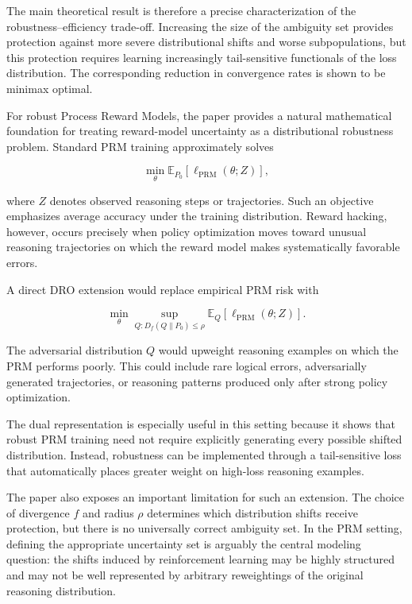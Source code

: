 \documentclass[11pt]{article}
\begin{document}
The main theoretical result is therefore a precise characterization of the robustness--efficiency trade-off. Increasing the size of the ambiguity set provides protection against more severe distributional shifts and worse subpopulations, but this protection requires learning increasingly tail-sensitive functionals of the loss distribution. The corresponding reduction in convergence rates is shown to be minimax optimal.

For robust Process Reward Models, the paper provides a natural mathematical foundation for treating reward-model uncertainty as a distributional robustness problem. Standard PRM training approximately solves

\[
\min_{\theta}
\mathbb{E}_{P_0}
\left[
\ell_{\mathrm{PRM}}(\theta;Z)
\right],
\]

where \(Z\) denotes observed reasoning steps or trajectories. Such an objective emphasizes average accuracy under the training distribution. Reward hacking, however, occurs precisely when policy optimization moves toward unusual reasoning trajectories on which the reward model makes systematically favorable errors.

A direct DRO extension would replace empirical PRM risk with

\[
\min_{\theta}
\sup_{Q:
D_f(Q\|P_0)\leq\rho}
\mathbb{E}_{Q}
\left[
\ell_{\mathrm{PRM}}(\theta;Z)
\right].
\]

The adversarial distribution \(Q\) would upweight reasoning examples on which the PRM performs poorly. This could include rare logical errors, adversarially generated trajectories, or reasoning patterns produced only after strong policy optimization.

The dual representation is especially useful in this setting because it shows that robust PRM training need not require explicitly generating every possible shifted distribution. Instead, robustness can be implemented through a tail-sensitive loss that automatically places greater weight on high-loss reasoning examples.

The paper also exposes an important limitation for such an extension. The choice of divergence \(f\) and radius \(\rho\) determines which distribution shifts receive protection, but there is no universally correct ambiguity set. In the PRM setting, defining the appropriate uncertainty set is arguably the central modeling question: the shifts induced by reinforcement learning may be highly structured and may not be well represented by arbitrary reweightings of the original reasoning distribution.
\end{document}
